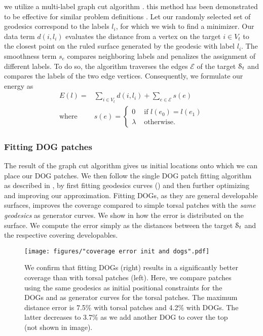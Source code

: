  we utilize a multi-label graph cut algorithm \cite{Boykov:GraphCut:2001}. 
this method has been demonstrated to be effective for similar problem definitions \cite{Herholz:HeightFields:2015}.
Let our randomly selected set of geodesics correspond to the labels $l_i$, for which we wish to find a minimizer.
Our data term $d(i, l_i)$ evaluates the distance from a vertex on the target $i \in V_t$ to the closest point on the ruled surface generated by the geodesic with label $l_i$. The smoothness term $s_e$ compares neighboring labels and penalizes the assignment of different labels. To do so, the algorithm traverses the edges $\mathcal{E}$ of the target $\mathcal{S}_t$ and compares the labels of the two edge vertices. 
Consequently, we formulate our energy as 
%
\begin{align*}
	E(l) = & \sum_{i \in V_t}{d(i, l_i)} + \sum_{e \in \mathcal{E}}{s(e)} \\
	\text{where }	\ \ 	& s(e) = \begin{cases}
							0		 & \text{ if } l(e_0) = l(e_1) \\ 
							\lambda  & \text{ otherwise. }
					\end{cases}
\end{align*}


\subsubsection{Fitting DOG patches}

The result of the graph cut algorithm gives us initial locations onto which we can place our DOG patches. We then follow the single DOG patch fitting algorithm as described in , by first fitting geodesics curves () and then further optimizing and improving our approximation.
Fitting DOGs, as they are general developable surfaces, improves the coverage compared to simple torsal patches with the \emph{same geodesics} as generator curves. We show in  how the error is distributed on the surface. We compute the error simply as the distances between the target $\mathcal{S}_t$ and the respective covering developables. 

\begin{figure} [h!]
\centering
\noindent\texttt{[image: figures/"coverage error init and dogs".pdf]}
\caption{
	We confirm that fitting DOGs (right) results in a significantly better coverage than with torsal patches (left). Here, we compare patches using the same geodesics as initial positional constraints for the DOGs and as generator curves for the torsal patches. The maximum distance error is 7.5\% with torsal patches and 4.2\% with DOGs. The latter decreases to 3.7\% as we add another DOG to cover the top (not shown in image).
	\label{fig:compare_error_torsal_vs_general}}
\end{figure}



